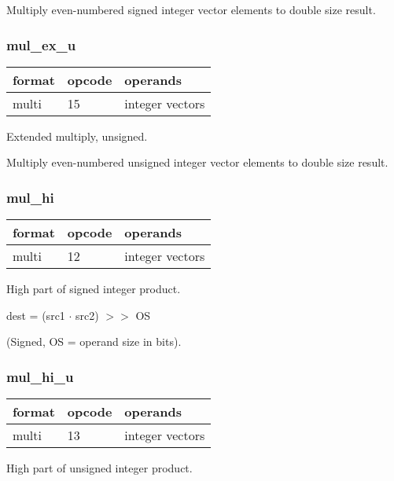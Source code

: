 \documentclass[forwardcom.tex]{subfiles}
\begin{document}
Multiply even-numbered signed integer vector elements to double size result.

\subsubsection{mul\_ex\_u}
\label{table:mulExUInstruction}
\begin{tabular}{|p{12mm}|p{12mm}|p{110mm}|}
\hline
\bfseries format & \bfseries opcode & \bfseries operands \\ \hline
multi & 15 & integer vectors \\ \hline
\end{tabular}
\vspace{2mm}

Extended multiply, unsigned.
\vspace{2mm}

Multiply even-numbered unsigned integer vector elements to double size result.

\subsubsection{mul\_hi}
\label{table:mulHiInstruction}
\begin{tabular}{|p{12mm}|p{12mm}|p{110mm}|}
\hline
\bfseries format & \bfseries opcode & \bfseries operands \\ \hline
multi & 12 & integer vectors \\ \hline
\end{tabular}
\vspace{2mm}

High part of signed integer product.
\vspace{2mm}

dest = (src1 $\cdot$ src2) $>>$ OS

(Signed, OS = operand size in bits).

\subsubsection{mul\_hi\_u}
\label{table:mulHiUInstruction}
\begin{tabular}{|p{12mm}|p{12mm}|p{110mm}|}
\hline
\bfseries format & \bfseries opcode & \bfseries operands \\ \hline
multi & 13 & integer vectors \\ \hline
\end{tabular}
\vspace{2mm}

High part of unsigned integer product.
\vspace{2mm}
\end{document}
